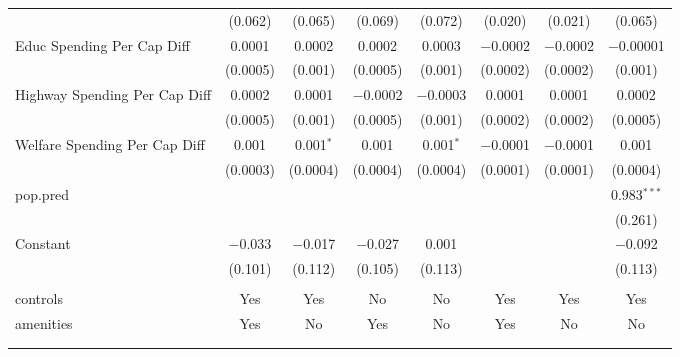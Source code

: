\begin{table}[!htbp]
\begin{tabular}{@{\extracolsep{5pt}}lccccccc}
  & (0.062) & (0.065) & (0.069) & (0.072) & (0.020) & (0.021) & (0.065) \\ 
  Educ Spending Per Cap Diff & 0.0001 & 0.0002 & 0.0002 & 0.0003 & $-$0.0002 & $-$0.0002 & $-$0.00001 \\ 
  & (0.0005) & (0.001) & (0.0005) & (0.001) & (0.0002) & (0.0002) & (0.001) \\ 
  Highway Spending Per Cap Diff & 0.0002 & 0.0001 & $-$0.0002 & $-$0.0003 & 0.0001 & 0.0001 & 0.0002 \\ 
  & (0.0005) & (0.001) & (0.0005) & (0.001) & (0.0002) & (0.0002) & (0.0005) \\ 
  Welfare Spending Per Cap Diff & 0.001 & 0.001$^{*}$ & 0.001 & 0.001$^{*}$ & $-$0.0001 & $-$0.0001 & 0.001 \\ 
  & (0.0003) & (0.0004) & (0.0004) & (0.0004) & (0.0001) & (0.0001) & (0.0004) \\ 
  pop.pred &  &  &  &  &  &  & 0.983$^{***}$ \\ 
  &  &  &  &  &  &  & (0.261) \\ 
  Constant & $-$0.033 & $-$0.017 & $-$0.027 & 0.001 &  &  & $-$0.092 \\ 
  & (0.101) & (0.112) & (0.105) & (0.113) &  &  & (0.113) \\ 
 \hline \\[-1.8ex] 
controls & Yes & Yes & No & No & Yes & Yes & Yes \\ 
amenities & Yes & No & Yes & No & Yes & No & No \\ 
\hline \\[-1.8ex] 
\hline 
\hline \\[-1.8ex] 
\end{tabular} 
\end{table} 
